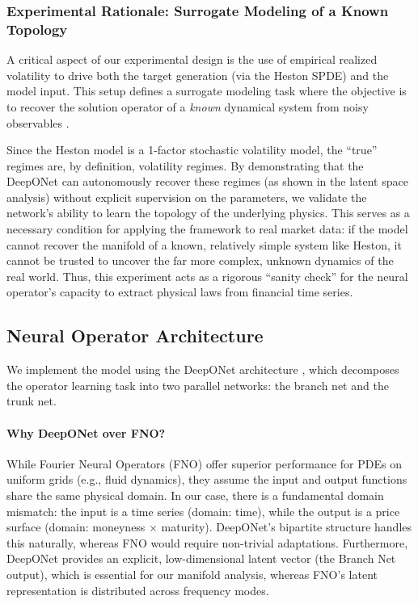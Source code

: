 \documentclass{article}
\begin{document}
\subsubsection{Experimental Rationale: Surrogate Modeling of a Known Topology}
A critical aspect of our experimental design is the use of empirical realized volatility to drive both the target generation (via the Heston SPDE) and the model input. This setup defines a surrogate modeling task where the objective is to recover the solution operator of a \emph{known} dynamical system from noisy observables \citep{karniadakis2021physics}.

Since the Heston model is a 1-factor stochastic volatility model, the ``true'' regimes are, by definition, volatility regimes. By demonstrating that the DeepONet can autonomously recover these regimes (as shown in the latent space analysis) without explicit supervision on the parameters, we validate the network's ability to learn the topology of the underlying physics. This serves as a necessary condition for applying the framework to real market data: if the model cannot recover the manifold of a known, relatively simple system like Heston, it cannot be trusted to uncover the far more complex, unknown dynamics of the real world. Thus, this experiment acts as a rigorous ``sanity check'' for the neural operator's capacity to extract physical laws from financial time series.

\subsection{Neural Operator Architecture}
We implement the model using the DeepONet architecture \citep{Lu_2021}, which decomposes the operator learning task into two parallel networks: the branch net and the trunk net.

\paragraph{Why DeepONet over FNO?} While Fourier Neural Operators (FNO) \citep{kovachki2021neuraloperator} offer superior performance for PDEs on uniform grids (e.g., fluid dynamics), they assume the input and output functions share the same physical domain. In our case, there is a fundamental domain mismatch: the input is a time series (domain: time), while the output is a price surface (domain: moneyness \(\times\) maturity). DeepONet's bipartite structure handles this naturally, whereas FNO would require non-trivial adaptations. Furthermore, DeepONet provides an explicit, low-dimensional latent vector (the Branch Net output), which is essential for our manifold analysis, whereas FNO's latent representation is distributed across frequency modes.
\end{document}
